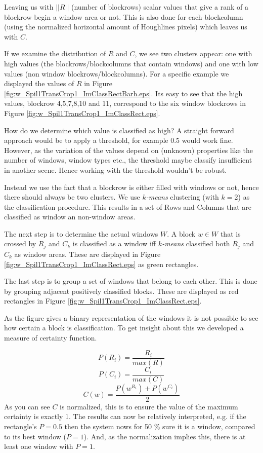 Leaving us with $||R||$ (number of blockrows) scalar values that give a rank of a blockrow begin a window area or not.
This is also done for each blockcolumn (using the normalized horizontal amount of
Houghlines pixels) which leaves us with $C$.

If we examine the distribution of $R$ and $C$, we see two clusters appear: one with
high values (the blockrows/blockcolumns that contain windows) and one with low values (non window
blockrows/blockcolumns). For a specific example we displayed the values of $R$ in Figure \ref{fig:w_Spil1TransCrop1_ImClassRectBarh.eps}.
Its easy to see that the high values, blockrow 4,5,7,8,10 and 11, correspond to the
six window blockrows in Figure \ref{fig:w_Spil1TransCrop1_ImClassRect.eps}.

How do we determine which value is classified as high?  A straight forward
approach would be to apply a threshold, for example 0.5 would work fine.
However, as the variation of the values depend on (unknown) properties like the
number of windows, window types etc., the threshold maybe classify insufficient
in another scene.  Hence working with the threshold wouldn't be robust. 

Instead we use the fact that a blockrow is either filled with windows or not, hence
there should always be two clusters.  We use \emph{$k$-means} clustering (with
$k=2$) as the classification procedure.
This results in a set of Rows and Columns that are classified as window an
non-window areas.

The next step is to determine the actual windows $W$.
A block $w\in W$ that is crossed by $R_j$ and $C_k$ is classified as a
window iff \emph{$k$-means} classified both $R_j$ and $C_k$ as window areas. These are displayed in 
 Figure \ref{fig:w_Spil1TransCrop1_ImClassRect.eps} as green rectangles.

The last step is to group a set of windows that belong to each other. This is done by 
grouping adjacent positively classified blocks. These are displayed as red
rectangles in Figure \ref{fig:w_Spil1TransCrop1_ImClassRect.eps}.

As the figure gives a binary representation of the windows it is not possible
to see how certain a block is classification.
To get insight about this we developed a measure of certainty function.

\[P(R_i) = \frac{R_i}{max(R)}\]
\[P(C_i) = \frac{C_i}{max(C)}\]
\[C(w) = \frac{P(w^{R_i}) + P(w^{C_i})}{2}\]
As you can see $C$ is normalized, this is to ensure the value of the maximum
certainty is exactly 1. The results can now be relatively interpreted, e.g. if the rectangle's $P=0.5$
then the system nows for 50 \% sure it is a window, compared to its best window ($P=1$). 
And, as the normalization implies this, there is at least one window with $P=1$. 

